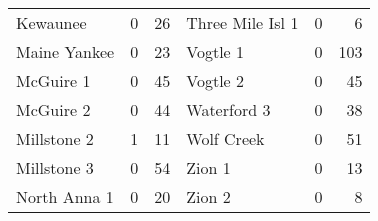 \documentclass {book}
\begin{document}
\begin{enumerate}[\ref{ch10}.1]
\begin{table}
\begin{tabular}{lcr |lcr}
Kewaunee         & {\hspace{0.1in}}0\mbox{\hspace{0.1in}} & 26\phantom{*}   &{\hspace{0.1in}}Three Mile Isl 1 & {\hspace{0.1in}}0\mbox{\hspace{0.1in}} & 6\\
Maine Yankee     & {\hspace{0.1in}}0\mbox{\hspace{0.1in}} & 23\phantom{*}   &{\hspace{0.1in}}Vogtle 1         & {\hspace{0.1in}}0\mbox{\hspace{0.1in}} & 103\\
McGuire 1        & {\hspace{0.1in}}0\mbox{\hspace{0.1in}} & 45\phantom{*}   &{\hspace{0.1in}}Vogtle 2         & {\hspace{0.1in}}0\mbox{\hspace{0.1in}} & 45\\
McGuire 2        & {\hspace{0.1in}}0\mbox{\hspace{0.1in}} & 44\phantom{*}   &{\hspace{0.1in}}Waterford 3      & {\hspace{0.1in}}0\mbox{\hspace{0.1in}} & 38\\
Millstone  2     & {\hspace{0.1in}}1\mbox{\hspace{0.1in}} & 11\phantom{*}   &{\hspace{0.1in}}Wolf Creek       & {\hspace{0.1in}}0\mbox{\hspace{0.1in}} & 51\\
Millstone  3     & {\hspace{0.1in}}0\mbox{\hspace{0.1in}} & 54\phantom{*}   &{\hspace{0.1in}}Zion 1           & {\hspace{0.1in}}0\mbox{\hspace{0.1in}} & 13\\
North Anna 1     & {\hspace{0.1in}}0\mbox{\hspace{0.1in}} & 20\phantom{*}   &{\hspace{0.1in}}Zion 2           & {\hspace{0.1in}}0\mbox{\hspace{0.1in}} & 8\\
\hline
\end{tabular}
\end{table}



\end{enumerate}
\end{document}
